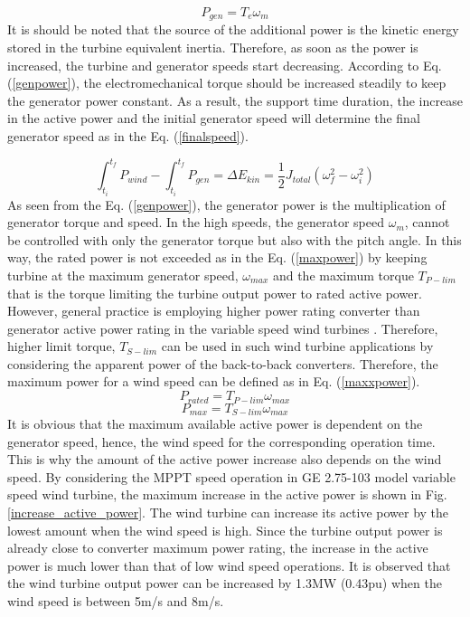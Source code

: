 \begin{equation}
P_{gen}=T_{e} \omega_{m}
\label{genpower}
\end{equation}
It is should be noted that the source of the additional power is the kinetic energy stored in the turbine equivalent inertia. Therefore, as soon as the power is increased, the turbine and generator speeds start decreasing. According to Eq. (\ref{genpower}), the electromechanical torque should be increased steadily to keep the generator power constant. As a result, the support time duration, the increase in the active power and the initial generator speed will determine the final generator speed as in the Eq. (\ref{finalspeed}).\par
\begin{equation}
 \int_{t_{i}}^{t_{f}}P_{wind}- \int_{t_{i}}^{t_{f}}P_{gen}=\Delta E_{kin}=\frac{1}{2}J_{total}(\omega_{f}^2-\omega_{i}^2)
\label{finalspeed}
\end{equation}
As seen from the Eq. (\ref{genpower}), the generator power is the multiplication of generator torque and speed. In the high speeds, the generator speed $\omega_{m}$, cannot be controlled with only the generator torque but also with the pitch angle. In this way, the rated power is not exceeded as in the Eq. (\ref{maxpower}) by keeping turbine at the maximum generator speed, $\omega_{max}$ and the maximum torque $T_{P-lim}$ that is the torque limiting the turbine output power to rated active power. However, general practice is employing higher power rating converter than generator active power rating in the variable speed wind turbines \cite{Muljadi2012}.  Therefore, higher limit torque, $T_{S-lim}$ can be used in such wind turbine applications by considering the apparent power of the back-to-back converters. Therefore, the maximum power for a wind speed can be defined as in Eq. (\ref{maxxpower}).
\begin{equation}
P_{rated}=T_{P-lim} \omega_{max}
\label{maxpower}
\end{equation}
\begin{equation}
P_{max}=T_{S-lim} \omega_{max}
\label{maxxpower}
\end{equation}
It is obvious that the maximum available active power is dependent on the generator speed, hence, the wind speed for the corresponding operation time. This is why the amount of the active power increase also depends on the wind speed. By considering the MPPT speed operation in GE 2.75-103 model variable speed wind turbine, the maximum increase in the active power is shown in Fig. \ref{increase_active_power}. The wind turbine can increase its active power by the lowest amount when the wind speed is high. Since the turbine output power is already close to converter maximum power rating, the increase in the active power is much lower than that of low wind speed operations. It is observed that the wind turbine output power can be increased by 1.3MW (0.43pu) when the wind speed is between 5m/s and 8m/s. \par
